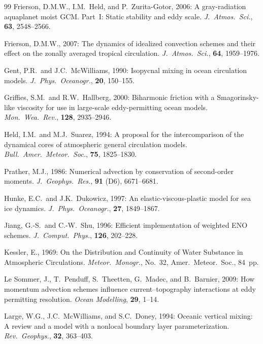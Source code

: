 \documentclass[11pt,a4paper]{article}
\begin{document}
\begin{thebibliography}{99}
Frierson, D.M.W., I.M.~Held, and P.~Zurita-Gotor, 2006:
A gray-radiation aquaplanet moist GCM. Part~I: Static stability and
eddy scale.
\textit{J.\ Atmos.\ Sci.}, \textbf{63}, 2548--2566.

Frierson, D.M.W., 2007:
The dynamics of idealized convection schemes and their effect on the
zonally averaged tropical circulation.
\textit{J.\ Atmos.\ Sci.}, \textbf{64}, 1959--1976.

Gent, P.R.\ and J.C.~McWilliams, 1990:
Isopycnal mixing in ocean circulation models.
\textit{J.\ Phys.\ Oceanogr.}, \textbf{20}, 150--155.

Griffies, S.M.\ and R.W.~Hallberg, 2000:
Biharmonic friction with a Smagorinsky-like viscosity for use in
large-scale eddy-permitting ocean models.
\textit{Mon.\ Wea.\ Rev.}, \textbf{128}, 2935--2946.

Held, I.M.\ and M.J.~Suarez, 1994:
A proposal for the intercomparison of the dynamical cores of atmospheric
general circulation models.
\textit{Bull.\ Amer.\ Meteor.\ Soc.}, \textbf{75}, 1825--1830.

Prather, M.J., 1986:
Numerical advection by conservation of second-order moments.
\textit{J.\ Geophys.\ Res.}, \textbf{91} (D6), 6671--6681.

Hunke, E.C.\ and J.K.~Dukowicz, 1997:
An elastic-viscous-plastic model for sea ice dynamics.
\textit{J.\ Phys.\ Oceanogr.}, \textbf{27}, 1849--1867.

Jiang, G.-S.\ and C.-W.~Shu, 1996:
Efficient implementation of weighted ENO schemes.
\textit{J.\ Comput.\ Phys.}, \textbf{126}, 202--228.

Kessler, E., 1969:
On the Distribution and Continuity of Water Substance in Atmospheric
Circulations.
\textit{Meteor.\ Monogr.}, No.~32, Amer.\ Meteor.\ Soc., 84~pp.

Le Sommer, J., T.~Penduff, S.~Theetten, G.~Madec, and B.~Barnier, 2009:
How momentum advection schemes influence current--topography interactions at
eddy permitting resolution.
\textit{Ocean Modelling}, \textbf{29}, 1--14.

Large, W.G., J.C.~McWilliams, and S.C.~Doney, 1994:
Oceanic vertical mixing: A review and a model with a nonlocal boundary
layer parameterization.
\textit{Rev.\ Geophys.}, \textbf{32}, 363--403.


\end{thebibliography}
\end{document}
